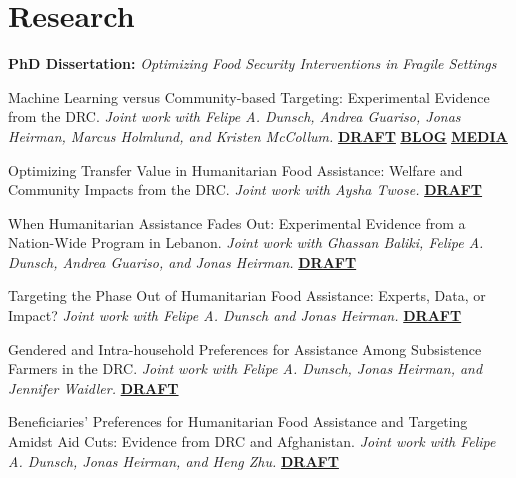 \documentclass[10pt]{article}
\newcommand{\link}[2]{\href{#1}{\textcolor{cvloc}{\textbf{#2}}}}
\begin{document}
\vspace{4pt}
\section{Research}
\textbf{PhD Dissertation:} \textit{Optimizing Food Security Interventions in Fragile Settings}\par
\begin{sqlist}[itemsep=8pt]
  \item Machine Learning versus Community-based Targeting: Experimental Evidence from the DRC. \textit{Joint work with Felipe A. Dunsch, Andrea Guariso, Jonas Heirman, Marcus Holmlund, and Kristen McCollum.} \link{https://jonathangarciaf.github.io/files/papers/Data_Driven_vs_CBT_DRC.pdf}{DRAFT} \link{https://wfp-evaluation.medium.com/optimizing-targeting-of-humanitarian-food-assistance-in-the-drc-precision-and-coverage-29c6d39d2ee9}{\underline{BLOG}} \link{https://www.povertyactionlab.org/blog/7-21-25/evidence-effect-evidence-action-conflict-and-crisis}{\underline{MEDIA}}
  \item Optimizing Transfer Value in Humanitarian Food Assistance: Welfare and Community Impacts from the DRC. \textit{Joint work with Aysha Twose.} \link{https://jonathangarciaf.github.io/files/papers/garcia-twose-optimizing-transfer-value-drc.pdf}{DRAFT}
  \item When Humanitarian Assistance Fades Out: Experimental Evidence from a Nation-Wide Program in Lebanon. \textit{Joint work with Ghassan Baliki, Felipe A. Dunsch, Andrea Guariso, and Jonas Heirman.} \link{https://jonathangarciaf.github.io/files/papers/baliki-et-al-when-humanitarian-assistance-fades-lebanon.pdf}{DRAFT}
  \item Targeting the Phase Out of Humanitarian Food Assistance: Experts, Data, or Impact? \textit{Joint work with Felipe A. Dunsch and Jonas Heirman.} \link{https://jonathangarciaf.github.io/files/papers/targeting-against-shocks.pdf}{DRAFT}
  \item Gendered and Intra-household Preferences for Assistance Among Subsistence Farmers in the DRC. \textit{Joint work with Felipe A. Dunsch, Jonas Heirman, and Jennifer Waidler.} \link{https://jonathangarciaf.github.io/files/papers/intra-household-dce-sk.pdf}{DRAFT}
  \item Beneficiaries' Preferences for Humanitarian Food Assistance and Targeting Amidst Aid Cuts: Evidence from DRC and Afghanistan. \textit{Joint work with Felipe A. Dunsch, Jonas Heirman, and Heng Zhu.} \link{https://jonathangarciaf.github.io/files/papers/drc-afg-dce-humanitarian.pdf}{DRAFT}
\end{sqlist}
\end{document}

